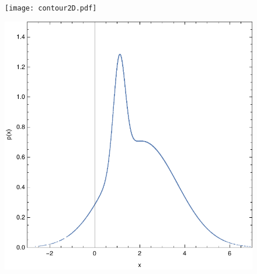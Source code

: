 \documentclass[12pt]{article}
\begin{document}
\title{}
\date{}
\author{Sebastian Merkt}

\begin{figure}[H]
	\centering
  \texttt{[image: contour2D.pdf]}\\
\end{figure}

\begin{figure}[H]
	\centering
  \includegraphics[scale=0.8]{margin.pdf}\\
\end{figure}
\end{document}
